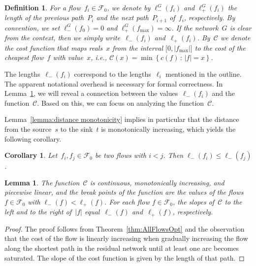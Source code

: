 \documentclass[11pt]{article}
\newtheorem{lemma}[theorem]{Lemma}
\newtheorem{definition}[theorem]{Definition}
\newtheorem{corollary}[theorem]{Corollary}
\newcommand{\F}{\mathcal{F}}
\newcommand{\fmax}{f_{\max}}
\renewcommand{\sp}{\ell}
\newcommand{\COST}{\mathscr{C}}
\newcommand{\WHERE}{\,\colon\,}
\newcommand{\SET}[1]{\left\{#1\right\}}
\newcommand{\spm}[1][]{\sp^{#1}_{-}}
\newcommand{\spp}[1][]{\sp^{#1}_{+}}
\begin{document}
\begin{definition}
For a flow~$f_i \in \F_0$, we denote by $\spm[G](f_i)$ and $\spp[G](f_i)$ the length of the previous path~$P_i$ and the next path~$P_{i+1}$ of~$f_i$, respectively. By convention, we set $\spm[G](f_0) = 0$ and $\spp[G](\fmax) = \infty$. If the network~$G$ is clear from the context, then we simply write~$\spm(f_i)$ and~$\spp(f_i)$. By~$\COST$ we denote the cost function that maps reals~$x$ from the interval $\big[ 0, |\fmax| \big]$ to the cost of the cheapest flow~$f$ with value~$x$, i.e., $\COST(x) = \min \SET{ c(f) \WHERE |f| = x }$.
\end{definition}

The lengths~$\spm(f_i)$ correspond to the lengths~$\ell_i$ mentioned in the outline. The apparent notational overhead is necessary for formal correctness. In Lemma~\ref{lemma:cost function form}, we will reveal a connection between the values~$\spm(f_i)$ and the function~$\COST$. Based on this, we can focus on analyzing the function~$\COST$.

Lemma~\ref{lemma:distance monotonicity} implies in particular that the distance from the source~$s$
to the sink~$t$ is monotonically increasing, which yields the following corollary. 
\begin{corollary}\label{corollary:path monotonicity}
Let~$f_i, f_j \in \F_0$ be two flows with $i < j$. Then $\spm(f_i) \leq \spm(f_j)$.
\end{corollary}



\begin{lemma}
\label{lemma:cost function form}
The function~$\COST$ is continuous, monotonically increasing, and piecewise linear, and the break points of the function are the values of the flows $f \in \F_0$ with $\spm(f) < \spp(f)$. For each flow $f \in \F_0$, the slopes of~$\COST$ to the left and to the right of~$|f|$ equal~$\spm(f)$ and~$\spp(f)$, respectively.
\end{lemma}

\begin{proof}
The proof follows from Theorem~\ref{thm:AllFlowsOpt} and the observation that the cost of the flow is linearly increasing when gradually increasing the flow along the shortest path in the residual network until at least one arc becomes saturated. The slope of the cost function is given by the length of that path. \end{proof}
\end{document}
